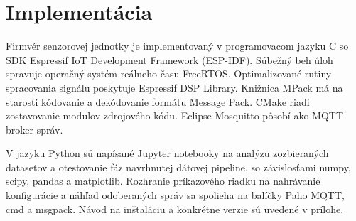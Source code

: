 \chapter{Implementácia}
Firmvér senzorovej jednotky je implementovaný v programovacom jazyku C so
SDK Espressif IoT Development Framework (ESP-IDF). Súbežný beh úloh spravuje operačný systém reálneho času FreeRTOS.
Optimalizované rutiny spracovania signálu poskytuje Espressif DSP Library. Knižnica MPack má na starosti
kódovanie a dekódovanie formátu Message Pack. CMake riadi zostavovanie
modulov zdrojového kódu. Eclipse Mosquitto pôsobí ako MQTT broker správ.

V jazyku Python sú napísané Jupyter notebooky na analýzu zozbieraných datasetov a otestovanie fáz navrhnutej dátovej pipeline,
so závislosťami numpy, scipy, pandas a matplotlib. Rozhranie príkazového riadku na nahrávanie konfigurácie a náhľad odoberaných
správ sa spolieha na balíčky Paho MQTT, cmd a msgpack. Návod na inštaláciu a konkrétne verzie sú uvedené v prílohe.

